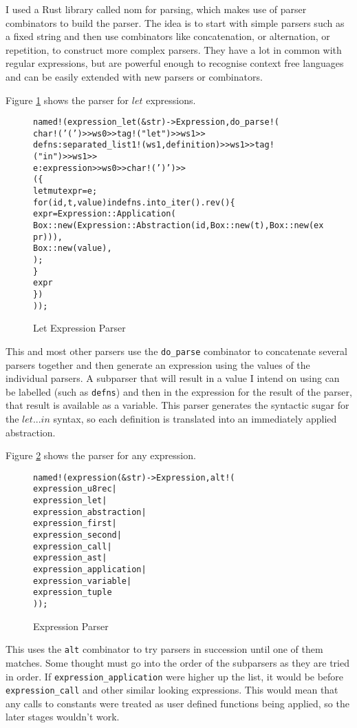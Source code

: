 I used a Rust library called nom for parsing, which makes use of parser combinators to build the parser.
The idea is to start with simple parsers such as a fixed string and then use combinators like concatenation,
or alternation, or repetition, to construct more complex parsers.
They have a lot in common with regular expressions, but are powerful enough to recognise context free languages
and can be easily extended with new parsers or combinators.

Figure \ref{fig:let_expression_parser} shows the parser for $let$ expressions.
\begin{figure}
    \begin{alltt}
named!(expression_let(&str) -> Expression, do_parse!(
  char!('(') >> ws0 >> tag!("let") >> ws1 >>
  defns: separated_list1!(ws1, definition) >> ws1 >> tag!("in") >> ws1 >>
  e: expression >> ws0 >> char!(')') >>
  (\{
    let mut expr = e;
    for (id, t, value) in defns.into_iter().rev() \{
      expr = Expression::Application(
        Box::new(Expression::Abstraction(id, Box::new(t), Box::new(expr))),
        Box::new(value),
      );
    \}
    expr
  \})
));
    \end{alltt}
    \caption{Let Expression Parser}
    \label{fig:let_expression_parser}
\end{figure}
This and most other parsers use the \texttt{do\_parse} combinator to concatenate several parsers together and then
generate an expression using the values of the individual parsers.
A subparser that will result in a value I intend on using can be labelled (such as \texttt{defns}) and then in
the expression for the result of the parser, that result is available as a variable.
This parser generates the syntactic sugar for the $let...in$ syntax, so each definition is translated into
an immediately applied abstraction.

Figure \ref{fig:expression_parser} shows the parser for any expression.
\begin{figure}
    \begin{alltt}
named!(expression(&str) -> Expression, alt!(
  expression_u8rec |
  expression_let |
  expression_abstraction |
  expression_first |
  expression_second |
  expression_call |
  expression_ast |
  expression_application |
  expression_variable |
  expression_tuple
));
    \end{alltt}
    \caption{Expression Parser}
    \label{fig:expression_parser}
\end{figure}
This uses the \texttt{alt} combinator to try parsers in succession until one of them matches.
Some thought must go into the order of the subparsers as they are tried in order.
If \texttt{expression\_application} were higher up the list, it would be before \texttt{expression\_call} and
other similar looking expressions.
This would mean that any calls to constants were treated as user defined functions being applied, so the
later stages wouldn't work.

